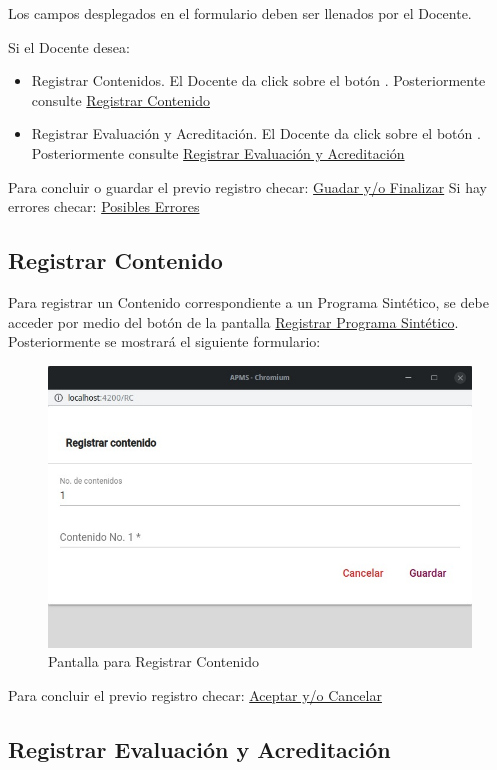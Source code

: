 Los campos desplegados en el formulario deben ser llenados por el Docente.

Si el Docente desea:

\begin{itemize}
    \item Registrar Contenidos. El Docente da click sobre el botón . Posteriormente consulte \hyperlink{RegC}{Registrar Contenido}
    \item Registrar Evaluación y Acreditación. El Docente da click sobre el botón . Posteriormente consulte \hyperlink{RegEyA}{Registrar Evaluación y Acreditación}
\end{itemize}

Para concluir o guardar el previo registro checar:
\hyperlink{GuardarFinalizar}{Guadar y/o Finalizar}
\pagebreak
Si hay errores checar: \hyperlink{Errores}{Posibles Errores}
\pagebreak

\hypertarget{RegC}{\subsection{Registrar Contenido}}

Para registrar un Contenido correspondiente a un Programa Sintético, se debe acceder por medio del botón  de la pantalla \hyperlink{RegistrarPS}{Registrar Programa Sintético}. Posteriormente se mostrará el siguiente formulario:

\begin{figure}[H]
    \centering
    \hypertarget{RegC}{\includegraphics[width=0.5\linewidth]{images/SP6/11.jpeg}}
    \caption{Pantalla para Registrar Contenido}
\end{figure}
Para concluir el previo registro checar:
\hyperlink{AceptarCancelar}{Aceptar y/o Cancelar}

\pagebreak
\hypertarget{RegEyA}{\subsection{Registrar Evaluación y Acreditación}}


